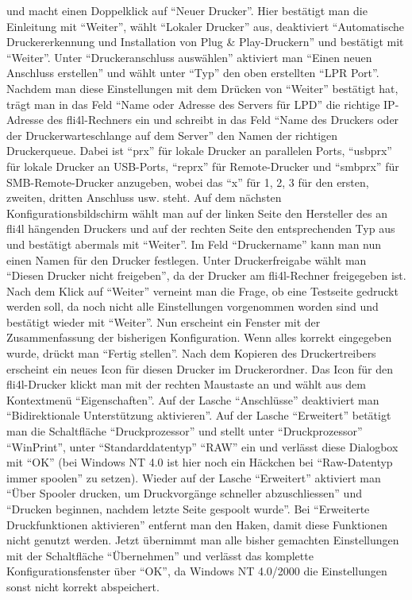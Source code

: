 \begin{enumerate}
    und macht einen Doppelklick auf ``Neuer Drucker''. Hier bestätigt man die
    Einleitung mit ``Weiter'', wählt ``Lokaler Drucker'' aus, deaktiviert
    ``Automatische Druckererkennung und Installation von Plug \& Play-Druckern''
    und bestätigt mit ``Weiter''. Unter ``Druckeranschluss auswählen'' aktiviert man
    ``Einen neuen Anschluss erstellen'' und wählt unter ``Typ'' den oben erstellten
    ``LPR Port''. Nachdem man diese Einstellungen mit dem Drücken von ``Weiter''
    bestätigt hat, trägt man in das Feld ``Name oder Adresse des Servers für
    LPD'' die richtige IP-Adresse des fli4l-Rechners ein und schreibt in das
    Feld ``Name des Druckers oder der Druckerwarteschlange auf dem Server'' den
    Namen der richtigen Druckerqueue. Dabei ist ``prx'' für lokale Drucker an
    parallelen Ports, ``usbprx'' für lokale Drucker an USB-Ports, ``reprx'' für
    Remote-Drucker und ``smbprx'' für SMB-Remote-Drucker anzugeben, wobei das
    ``x'' für 1, 2, 3 für den ersten, zweiten, dritten Anschluss usw. steht.
    Auf dem nächsten Konfigurationsbildschirm wählt man auf der
    linken Seite den Hersteller des an fli4l hängenden Druckers und auf der
    rechten Seite den entsprechenden Typ aus und bestätigt abermals mit
    ``Weiter''. Im Feld ``Druckername'' kann man nun einen Namen für den Drucker
    festlegen. Unter Druckerfreigabe wählt man ``Diesen Drucker nicht
    freigeben'', da der Drucker am fli4l-Rechner freigegeben ist. Nach dem Klick
    auf ``Weiter'' verneint man die Frage, ob eine Testseite gedruckt werden
    soll, da noch nicht alle Einstellungen vorgenommen worden sind und
    bestätigt wieder mit ``Weiter''. Nun erscheint ein Fenster mit der
    Zusammenfassung der bisherigen Konfiguration. Wenn alles korrekt eingegeben
    wurde, drückt man ``Fertig stellen''. Nach dem Kopieren des Druckertreibers
    erscheint ein neues Icon für diesen Drucker im Druckerordner. Das Icon für
    den fli4l-Drucker klickt man mit der rechten Maustaste an und wählt aus dem
    Kontextmenü ``Eigenschaften''. Auf der Lasche ``Anschlüsse'' deaktiviert man
    ``Bidirektionale Unterstützung aktivieren''. Auf der Lasche ``Erweitert''
    betätigt man die Schaltfläche ``Druckprozessor'' und stellt unter
    ``Druckprozessor'' ``WinPrint'', unter ``Standarddatentyp'' ``RAW'' ein und verlässt
    diese Dialogbox mit ``OK'' (bei Windows NT 4.0 ist hier noch ein Häckchen bei
    ``Raw-Datentyp immer spoolen'' zu setzen). Wieder auf der Lasche ``Erweitert''
    aktiviert man ``Über Spooler drucken, um Druckvorgänge schneller
    abzuschliessen'' und ``Drucken beginnen, nachdem letzte Seite gespoolt wurde''.
    Bei ``Erweiterte Druckfunktionen aktivieren'' entfernt man den Haken, damit
    diese Funktionen nicht genutzt werden. Jetzt übernimmt man alle bisher
    gemachten Einstellungen mit der Schaltfläche ``Übernehmen'' und verlässt das
    komplette Konfigurationsfenster über ``OK'', da Windows NT 4.0/2000 die
    Einstellungen sonst nicht korrekt abspeichert.



\end{enumerate}
